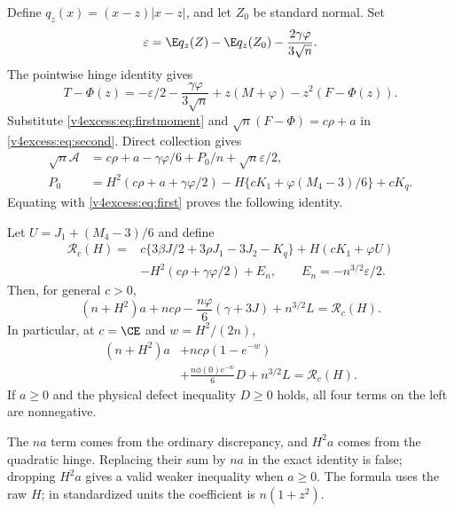 Define $q_z(x)=(x-z)|x-z|$, and let $Z_0$ be standard normal. Set
\[
 \varepsilon=\E q_z(Z)-\E q_z(Z_0)-\frac{2\gamma\varphi}{3\sqrt n}.
\]
The pointwise hinge identity gives
\[
 T-\Phi(z)=-\varepsilon/2-\frac{\gamma\varphi}{3\sqrt n}
                     +z(M+\varphi)-z^2(F-\Phi(z)).
\]
Substitute \eqref{v4excess:eq:firstmoment} and
$\sqrt n(F-\Phi)=c\rho+a$ in \eqref{v4excess:eq:second}. Direct collection gives
\begin{align*}
 \sqrt n\mathcal A&=c\rho+a-\gamma\varphi/6+P_0/n
                                          +\sqrt n\varepsilon/2,\\
 P_0&=H^2(c\rho+a+\gamma\varphi/2)
       -H\{cK_1+\varphi(M_4-3)/6\}+cK_q.
\end{align*}
Equating with \eqref{v4excess:eq:first} proves the following identity.

\begin{theorem}\label{v4excess:thm:identity}
Let $U=J_1+(M_4-3)/6$ and define
\begin{align*}
 \mathcal R_c(H)={}&c\{3\beta J/2+3\rho J_1-3J_2-K_q\}
    +H(cK_1+\varphi U)\\
 &-H^2(c\rho+\gamma\varphi/2)+E_n,
 \qquad E_n=-n^{3/2}\varepsilon/2.
\end{align*}
Then, for general $c>0$,
\begin{equation}\label{v4excess:eq:general}
 (n+H^2)a+nc\rho-\frac{n\varphi}{6}(\gamma+3J)+n^{3/2}L
 =\mathcal R_c(H).
\end{equation}
In particular, at $c=\CE$ and $w=H^2/(2n)$,
\begin{equation}\label{v4excess:eq:conserved}
 \boxed{\begin{aligned}
 (n+H^2)a&+nc\rho(1-e^{-w})\\
 &+\frac{n\phi(0)e^{-w}}6D+n^{3/2}L=\mathcal R_c(H).
 \end{aligned}}
\end{equation}
If $a\ge0$ and the physical defect inequality $D\ge0$ holds, all four
terms on the left are nonnegative.
\end{theorem}
The $na$ term comes from the ordinary discrepancy, and $H^2a$ comes from
the quadratic hinge. Replacing their sum by $na$ in the exact identity is
false; dropping $H^2a$ gives a valid weaker inequality when $a\ge0$. The formula
uses the raw $H$; in standardized units the coefficient is $n(1+z^2)$.

